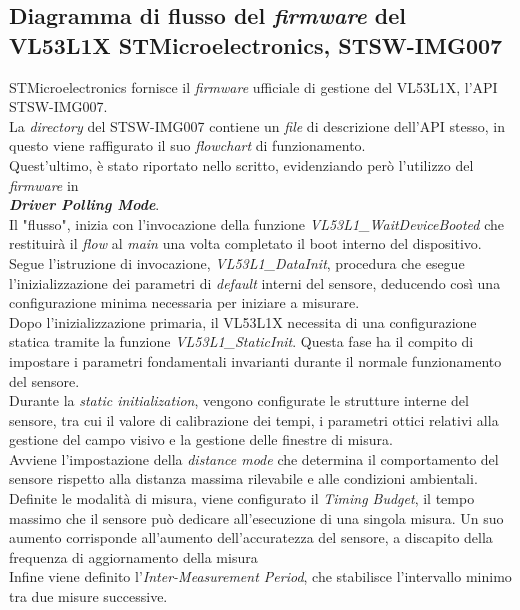 \subsection{Diagramma di flusso del \textit{firmware} del VL53L1X STMicroelectronics, STSW-IMG007}
STMicroelectronics fornisce il \textit{firmware} ufficiale di gestione del VL53L1X, l'API \\
STSW-IMG007.\\
La \textit{directory} del STSW-IMG007 contiene un \textit{file} di descrizione dell'API stesso, in questo viene raffigurato il suo \textit{flowchart} di funzionamento.\\
Quest'ultimo, è stato riportato nello scritto, evidenziando però l'utilizzo del \textit{firmware} in\\\textbf{\textit{Driver Polling Mode}}.\\
Il "flusso", inizia con l'invocazione della funzione \textit{VL53L1\_WaitDeviceBooted} che restituirà il \textit{flow} al \textit{main} una volta completato il boot interno del dispositivo.\\
Segue l'istruzione di invocazione, \textit{VL53L1\_DataInit}, procedura che esegue l'inizializzazione dei parametri di \textit{default} interni del sensore, deducendo così una configurazione minima necessaria per iniziare a misurare.\\
Dopo l'inizializzazione primaria, il VL53L1X necessita di una configurazione statica tramite la funzione \textit{VL53L1\_StaticInit}. Questa fase ha il compito di impostare i parametri fondamentali invarianti durante il normale funzionamento del sensore.\\
Durante la \textit{static initialization}, vengono configurate le strutture interne del sensore, tra cui il valore di calibrazione dei tempi, i parametri ottici relativi alla gestione del campo visivo e la gestione delle finestre di misura.\\
Avviene l'impostazione della \textit{distance mode} che determina il comportamento del sensore rispetto alla distanza massima rilevabile e alle condizioni ambientali.\\
Definite le modalità di misura, viene configurato il \textit{Timing Budget}, il tempo massimo che il sensore può dedicare all'esecuzione di una singola misura. Un suo aumento corrisponde all'aumento dell'accuratezza del sensore, a discapito della frequenza di aggiornamento della misura\\
Infine viene definito l'\textit{Inter-Measurement Period}, che stabilisce l'intervallo minimo tra due misure successive.\\
